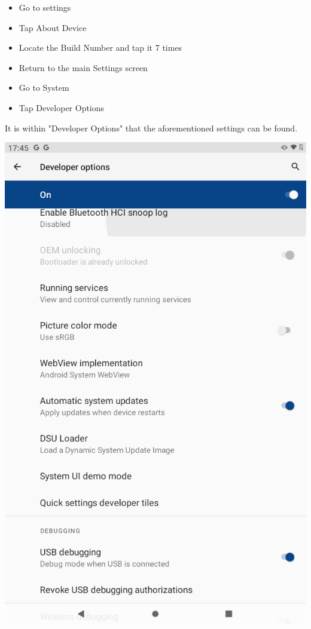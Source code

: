 \begin{itemize}

\item Go to settings
\item Tap About Device
\item Locate the Build Number and tap it 7 times
\item Return to the main Settings screen
\item Go to System
\item Tap Developer Options

\end{itemize}

It is within "Developer Options" that the aforementioned settings can be found.

\includegraphics{images/DeveloperOptions}

